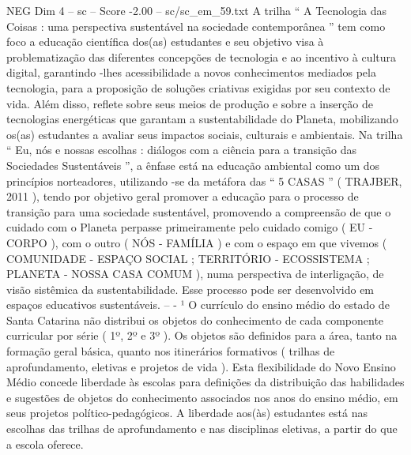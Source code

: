 \begin{textsample}{NEG Dim 4 – sc – Score -2.00 – sc/sc\_em\_59.txt}
A trilha “ A Tecnologia das Coisas : uma perspectiva sustentável na sociedade contemporânea ” tem como foco a educação científica dos(as) estudantes e seu objetivo visa à problematização das diferentes concepções de tecnologia e ao incentivo à cultura digital, garantindo -lhes acessibilidade a novos conhecimentos mediados pela tecnologia, para a proposição de soluções criativas exigidas por seu contexto de vida.
Além disso, reflete sobre seus meios de produção e sobre a inserção de tecnologias energéticas que garantam a sustentabilidade do Planeta, mobilizando os(as) estudantes a avaliar seus impactos sociais, culturais e ambientais.
Na trilha “ Eu, nós e nossas escolhas : diálogos com a ciência para a transição das Sociedades Sustentáveis ”, a ênfase está na educação ambiental como um dos princípios norteadores, utilizando -se da metáfora das “ 5 CASAS ” ( TRAJBER, 2011 ), tendo por objetivo geral promover a educação para o processo de transição para uma sociedade sustentável, promovendo a compreensão de que o cuidado com o Planeta perpasse primeiramente pelo cuidado comigo ( EU - CORPO ), com o outro ( NÓS - FAMÍLIA ) e com o espaço em que vivemos ( COMUNIDADE - ESPAÇO SOCIAL ; TERRITÓRIO - ECOSSISTEMA ; PLANETA - NOSSA CASA COMUM ), numa perspectiva de interligação, de visão sistêmica da sustentabilidade.
Esse processo pode ser desenvolvido em espaços educativos sustentáveis. -- - ¹ O currículo do ensino médio do estado de Santa Catarina não distribui os objetos do conhecimento de cada componente curricular por série ( 1º, 2º e 3º ).
Os objetos são definidos para a área, tanto na formação geral básica, quanto nos itinerários formativos ( trilhas de aprofundamento, eletivas e projetos de vida ).
Esta flexibilidade do Novo Ensino Médio concede liberdade às escolas para definições da distribuição das habilidades e sugestões de objetos do conhecimento associados nos anos do ensino médio, em seus projetos político-pedagógicos.
A liberdade aos(às) estudantes está nas escolhas das trilhas de aprofundamento e nas disciplinas eletivas, a partir do que a escola oferece.

\end{textsample}
